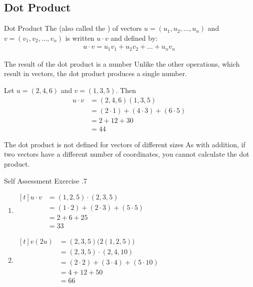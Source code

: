 \documentclass[\main/notes.tex]{subfiles}
\begin{document}
			\subsection{Dot Product}
				\begin{definition}[width=0.87\textwidth]{Dot Product}
					The  (also called the ) of vectors $u = (u_{1}, u_{2}, \ldots, u_{n})$ and \\$v = (v_{1}, v_{2}, \ldots, v_{n})$ is written $u \cdot v$ and defined by:
					\begin{align*}
						u \cdot v = u_{1}v_{1} + u_{2}v_{2} + \ldots + u_{n}v_{n}
					\end{align*}
				\end{definition}
				\begin{sidenote}{The result of the dot product is a number}
					Unlike the other operations, which result in vectors, the dot product produces a single number.
				\end{sidenote}
				\begin{example}[width=0.6\textwidth]
					Let $u = (2, 4, 6)$ and $v = (1, 3, 5)$. Then
					\begin{align*}
						u \cdot v &= (2, 4, 6)(1, 3, 5)\\
						&= (2 \cdot 1) + (4 \cdot 3) + (6 \cdot 5)\\
						&= 2 + 12 + 30\\
						&= 44
					\end{align*}
				\end{example}
				\begin{sidenote}{The dot product is not defined for vectors of different sizes}
					As with addition, if two vectors have a different number of coordinates, you cannot calculate the dot product.
				\end{sidenote}
			\begin{exercise}{Self Assessment Exercise \thechapter.7}
				\begin{enumerate}[label=(\alph*)]
					\item {} \hfill
						$ \begin{aligned}[t]
							u \cdot v &= (1, 2, 5) \cdot (2, 3, 5)\\
							&= (1 \cdot 2) + (2 \cdot 3) + (5 \cdot 5)\\
							&= 2 + 6 + 25\\
							&= 33
						\end{aligned} $\hfill \phantom{}
					\item {} \hfill $
						\begin{aligned}[t]
							v(2u) &= (2, 3, 5)\bigl(2(1, 2, 5)\bigr)\\
							&= (2, 3, 5) \cdot (2, 4, 10)\\
							&= (2 \cdot 2) + (3 \cdot 4) + (5 \cdot 10)\\
							&= 4 + 12 + 50\\
							&= 66
						\end{aligned} $ \hfill \phantom{}
				\end{enumerate}
			\end{exercise}
		\pagebreak
\end{document}
